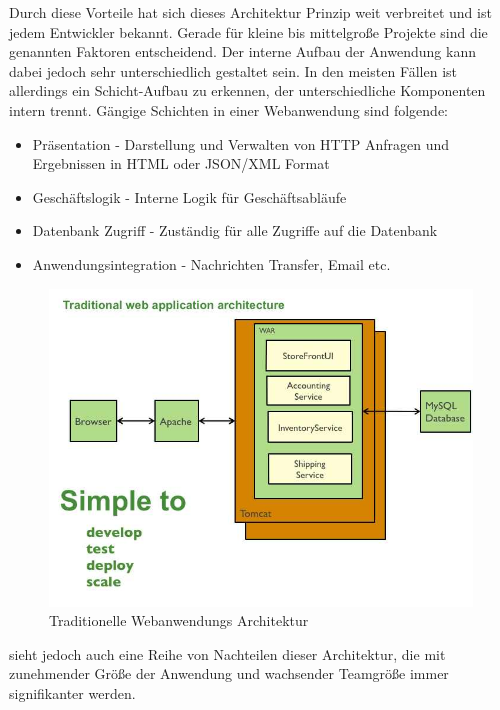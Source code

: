 	Durch diese Vorteile hat sich dieses Architektur Prinzip weit verbreitet und ist jedem Entwickler bekannt. Gerade für kleine bis mittelgroße Projekte sind die genannten Faktoren entscheidend. Der interne Aufbau der Anwendung kann dabei jedoch sehr unterschiedlich gestaltet sein. In den meisten Fällen ist allerdings ein Schicht-Aufbau zu erkennen, der unterschiedliche Komponenten intern trennt. Gängige Schichten in einer Webanwendung sind folgende:
	\begin{itemize}
	\item Präsentation - Darstellung und Verwalten von HTTP Anfragen und Ergebnissen in HTML oder JSON/XML Format
	\item Geschäftslogik - Interne Logik für Geschäftsabläufe
	\item Datenbank Zugriff - Zuständig für alle Zugriffe auf die Datenbank
	\item Anwendungsintegration - Nachrichten Transfer, Email etc.
	\end{itemize}
	
	\begin{figure}[h]
		\centering
		\includegraphics[width=0.9\linewidth]{images/TraditionalWebArchitecture}
		\caption{Traditionelle Webanwendungs Architektur}
		\label{fig:TraditionalWebArchitecture}
	\end{figure}

	\cite*{Richardson.2014} sieht jedoch auch eine Reihe von Nachteilen dieser Architektur, die mit zunehmender Größe der Anwendung und wachsender Teamgröße immer signifikanter werden.
	
